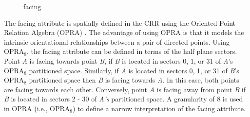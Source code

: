 \documentclass[12pt]{ucthesis}
\begin{document}
\begin{figure}[H]
 \centering
 \hspace{10 mm}
  \hspace{10 mm}
 \hspace{10 mm}
 \caption{facing}
\label{display-arrangement}
\end{figure}

The facing attribute is spatially defined in the CRR using the Oriented Point Relation Algebra (OPRA) \cite{Moratz}. The advantage of using OPRA is that it models the intrinsic orientational relationships between a pair of directed points. Using OPRA$_{8}$, the facing attribute can be defined in terms of the half plane sectors. Point \emph{A} is facing towards point \emph{B}, if \emph{B} is located in sectors 0, 1, or 31 of \emph{A}'s OPRA$_{8}$ partitioned space. Similarly, if \emph{A} is located in sectors 0, 1, or 31 of \emph{B}'s OPRA$_{8}$ partitioned space then \emph{B} is facing towards \emph{A}. In this case, both points are facing towards each other. Conversely, point \emph{A} is facing away from point \emph{B} if \emph{B} is located in sectors 2 - 30 of \emph{A's} partitioned space. A granularity of 8 is used in OPRA (i.e., OPRA$_{8}$) to define a narrow interpretation of the facing attribute. 
\end{document}
